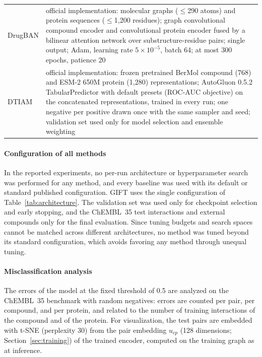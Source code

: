 \documentclass[11pt,letterpaper]{article}
\begin{document}
\begin{table}[!htbp]
\begin{tabularx}{\textwidth}{l X}
\addlinespace
DrugBAN & official implementation: molecular graphs ($\leq$290 atoms) and protein sequences ($\leq$1,200 residues); graph convolutional compound encoder and convolutional protein encoder fused by a bilinear attention network over substructure-residue pairs; single output; Adam, learning rate $5\times10^{-5}$, batch 64; at most 300 epochs, patience 20 \\
\addlinespace
DTIAM & official implementation: frozen pretrained BerMol compound (768) and ESM-2 650M protein (1,280) representations; AutoGluon 0.5.2 TabularPredictor with default presets (ROC-AUC objective) on the concatenated representations, trained in every run; one negative per positive drawn once with the same sampler and seed; validation set used only for model selection and ensemble weighting \\
\bottomrule
\end{tabularx}
\end{table}

\paragraph{Configuration of all methods}
In the reported experiments, no per-run architecture or hyperparameter search was performed for any method, and every baseline was used with its default or standard published configuration. GIFT uses the single configuration of Table~\ref{tab:architecture}. The validation set was used only for checkpoint selection and early stopping, and the ChEMBL~35 test interactions and external compounds only for the final evaluation. Since tuning budgets and search spaces cannot be matched across different architectures, no method was tuned beyond its standard configuration, which avoids favoring any method through unequal tuning.

\paragraph{Misclassification analysis}
The errors of the model at the fixed threshold of 0.5 are analyzed on the ChEMBL~35 benchmark with random negatives: errors are counted per pair, per compound, and per protein, and related to the number of training interactions of the compound and of the protein. For visualization, the test pairs are embedded with t-SNE \cite{vandermaaten2008visualizing} (perplexity 30) from the pair embedding $u_{cp}$ (128 dimensions; Section~\ref{sec:training}) of the trained encoder, computed on the training graph as at inference.
\end{document}
